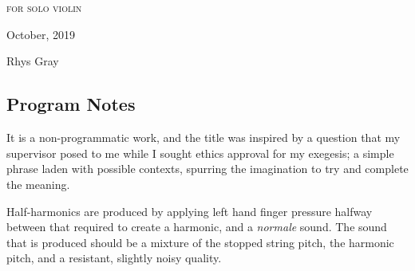 \newpage

\chapter[\violinPiece]{}


\vspace*{3cm}
\begin{center}
\textsc{for solo violin}
\vspace*{3.5cm}

\HRule{0.5pt}


\LARGE \textbf{\uppercase{\violinPiece}}
\HRule{2pt}

\vspace{1.3cm}

\normalsize October, 2019
\date{}

\vspace*{5\baselineskip}

Rhys Gray

\end{center}
\newpage
\section*{Program Notes}
It is a non-programmatic work, and the title was inspired by a question that my supervisor posed to me while I sought ethics approval for my exegesis; a simple phrase laden with possible contexts, spurring the imagination to try and complete the meaning.

Half-harmonics are produced by applying left hand finger pressure halfway between that required to create a harmonic, and a \emph{normale} sound. 
The sound that is produced should be a mixture of the stopped string pitch, the harmonic pitch, and a resistant, slightly noisy quality.

